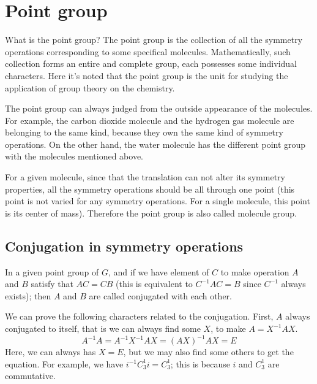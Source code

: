 \section{Point group}
%
What is the point group? The point group is the collection of all the
symmetry operations corresponding to some specifical molecules.
Mathematically, such collection forms an entire and complete group,
each possesses some individual characters. Here it's noted that the
point group is the unit for studying the application of group theory
on the chemistry.

The point group can always judged from the outside appearance of the
molecules. For example, the carbon dioxide molecule and the hydrogen
gas molecule are belonging to the same kind, because they own the same
kind of symmetry operations. On the other hand, the water molecule has
the different point group with the molecules mentioned above.

For a given molecule, since that the translation can not alter its
symmetry properties, all the symmetry operations should be all through
one point (this point is not varied for any symmetry operations. For a
single molecule, this point is its center of mass). Therefore the
point group is also called molecule group.


\subsection{Conjugation in symmetry operations}
%
%
%
In a given point group of $G$, and if we have element of $C$ to make
operation $A$ and $B$ satisfy that $AC=CB$ (this is equivalent to
$C^{-1}AC = B$ since $C^{-1}$ always exists); then $A$ and $B$ are
called conjugated with each other.

We can prove the following characters related to the conjugation.
First, $A$ always conjugated to itself, that is we can always find
some $X$, to make $A = X^{-1}AX$.
\begin{equation}\label{}
  A^{-1}A = A^{-1}X^{-1}AX = (AX)^{-1}AX = E
\end{equation}
Here, we can always has $X = E$, but we may also find some others to
get the equation. For example, we have $i^{-1}C^{1}_{3}i = C^{1}_{3}$;
this is because $i$ and $C^{1}_{3}$ are commutative.

